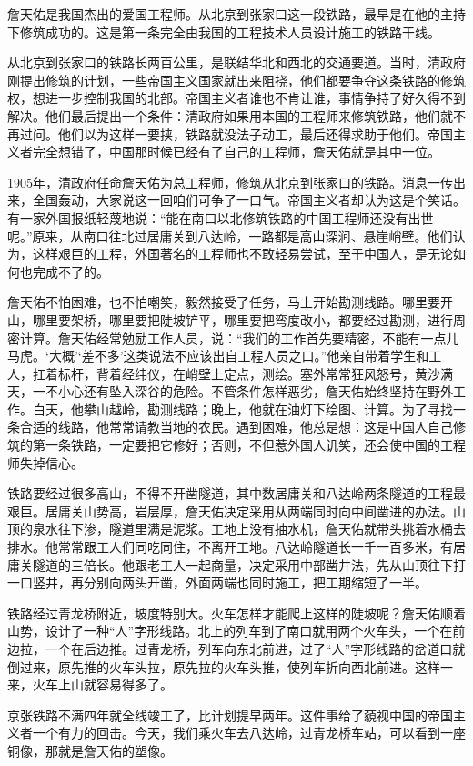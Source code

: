 \documentclass[12pt,UTF-8,openany]{ctexbook}
\begin{document}
\begin{large}
    
    詹天佑是我国杰出的爱国工程师。从北京到张家口这一段铁路，最早是在他的主持下修筑成功的。这是第一条完全由我国的工程技术人员设计施工的铁路干线。
    
    从北京到张家口的铁路长两百公里，是联结华北和西北的交通要道。当时，清政府刚提出修筑的计划，一些帝国主义国家就出来阻挠，他们都要争夺这条铁路的修筑权，想进一步控制我国的北部。帝国主义者谁也不肯让谁，事情争持了好久得不到解决。他们最后提出一个条件：清政府如果用本国的工程师来修筑铁路，他们就不再过问。他们以为这样一要挟，铁路就没法子动工，最后还得求助于他们。帝国主义者完全想错了，中国那时候已经有了自己的工程师，詹天佑就是其中一位。
    
    1905年，清政府任命詹天佑为总工程师，修筑从北京到张家口的铁路。消息一传出来，全国轰动，大家说这一回咱们可争了一口气。帝国主义者却认为这是个笑话。有一家外国报纸轻蔑地说：“能在南口以北修筑铁路的中国工程师还没有出世呢。”原来，从南口往北过居庸关到八达岭，一路都是高山深涧、悬崖峭壁。他们认为，这样艰巨的工程，外国著名的工程师也不敢轻易尝试，至于中国人，是无论如何也完成不了的。
    
    詹天佑不怕困难，也不怕嘲笑，毅然接受了任务，马上开始勘测线路。哪里要开山，哪里要架桥，哪里要把陡坡铲平，哪里要把弯度改小，都要经过勘测，进行周密计算。詹天佑经常勉励工作人员，说：“我们的工作首先要精密，不能有一点儿马虎。‘大概’‘差不多’这类说法不应该出自工程人员之口。”他亲自带着学生和工人，扛着标杆，背着经纬仪，在峭壁上定点，测绘。塞外常常狂风怒号，黄沙满天，一不小心还有坠入深谷的危险。不管条件怎样恶劣，詹天佑始终坚持在野外工作。白天，他攀山越岭，勘测线路；晚上，他就在油灯下绘图、计算。为了寻找一条合适的线路，他常常请教当地的农民。遇到困难，他总是想：这是中国人自己修筑的第一条铁路，一定要把它修好；否则，不但惹外国人讥笑，还会使中国的工程师失掉信心。
    
    铁路要经过很多高山，不得不开凿隧道，其中数居庸关和八达岭两条隧道的工程最艰巨。居庸关山势高，岩层厚，詹天佑决定采用从两端同时向中间凿进的办法。山顶的泉水往下渗，隧道里满是泥浆。工地上没有抽水机，詹天佑就带头挑着水桶去排水。他常常跟工人们同吃同住，不离开工地。八达岭隧道长一千一百多米，有居庸关隧道的三倍长。他跟老工人一起商量，决定采用中部凿井法，先从山顶往下打一口竖井，再分别向两头开凿，外面两端也同时施工，把工期缩短了一半。
    
    铁路经过青龙桥附近，坡度特别大。火车怎样才能爬上这样的陡坡呢？詹天佑顺着山势，设计了一种“人”字形线路。北上的列车到了南口就用两个火车头，一个在前边拉，一个在后边推。过青龙桥，列车向东北前进，过了“人”字形线路的岔道口就倒过来，原先推的火车头拉，原先拉的火车头推，使列车折向西北前进。这样一来，火车上山就容易得多了。
    
    京张铁路不满四年就全线竣工了，比计划提早两年。这件事给了藐视中国的帝国主义者一个有力的回击。今天，我们乘火车去八达岭，过青龙桥车站，可以看到一座铜像，那就是詹天佑的塑像。
    
\end{large}
\end{document}

